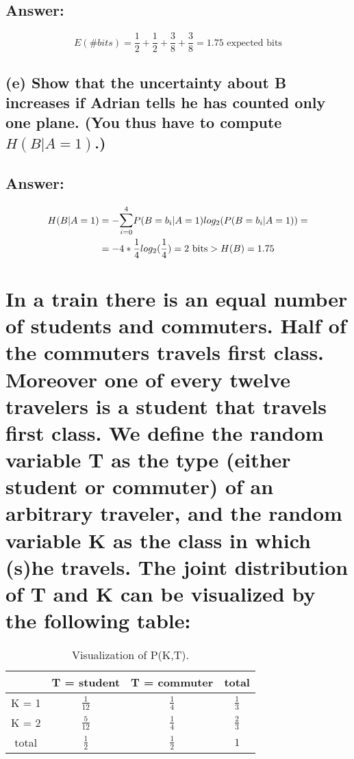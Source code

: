 \documentclass[11px]{article}
\begin{document}
\subsection*{Answer: }

\begin{equation}
E(\#bits) = \frac{1}{2} + \frac{1}{2} + \frac{3}{8} + \frac{3}{8} = 1.75 \text{ expected bits}
\end{equation}

\subsection*{\normalfont (e) Show that the uncertainty about B increases if Adrian tells he has counted only one plane. (You thus have to compute \(H(B|A = 1)\).)}

\subsection*{Answer: }

\begin{equation}
\begin{split}
H(B|A = 1) & = -\mathlarger{\sum}_{i=0}^{4} P(B = b_i|A = 1)log_2(P(B = b_i|A = 1)) = \\ 
& = -4*\frac{1}{4}log_2(\frac{1}{4}) = 2 \text{ bits} > H(B) = 1.75
\end{split}    
\end{equation}



\section{\normalfont In a train there is an equal number of students and commuters. Half of the commuters travels first class. Moreover one of every twelve travelers is a student that travels first class. We define the random variable T as the type (either student or commuter) of an arbitrary traveler, and the random variable K as the class in which (s)he travels. The joint distribution of T and K can be visualized by the following table:}

\begin{table}[ht]
\centering
\begin{adjustbox}{width=0.7\linewidth}
\begin{tabular}{|c|c|c|c|}
\hline
     & T = student & T = commuter & total \\ \hline
K = 1 & \(\frac{1}{12}\) & \(\frac{1}{4}\) & $\frac{1}{3}$\\ \hline
K = 2 & \(\frac{5}{12}\) & \(\frac{1}{4}\) & $\frac{2}{3}$\\ \hline
total & \(\frac{1}{2}\) & \(\frac{1}{2}\) & $1$\\ \hline
\end{tabular}
\end{adjustbox}
\caption{Visualization of P(K,T).} 
\end{table}
\end{document}

